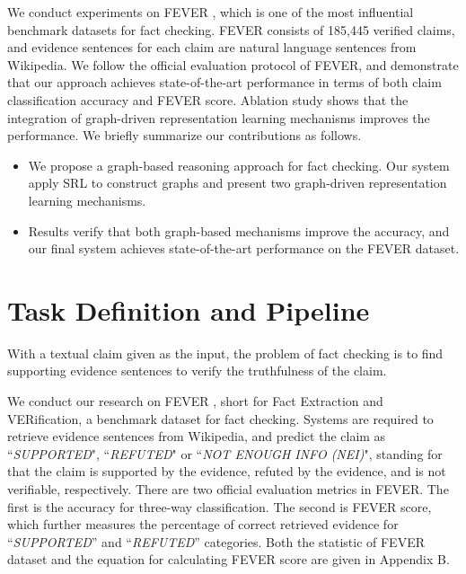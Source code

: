 \documentclass[11pt,a4paper]{article}
\begin{document}
We conduct experiments on FEVER \cite{thorne2018fever}, 
which is one of the most influential benchmark datasets for fact checking.
FEVER consists of 185,445 verified claims, and evidence sentences for each claim are natural language sentences from Wikipedia. 
We follow the official evaluation protocol of FEVER, and demonstrate that
our approach achieves state-of-the-art performance in terms of both claim classification accuracy and FEVER score.
Ablation study shows that the integration of graph-driven representation learning mechanisms improves the performance.
We briefly summarize our contributions as follows.
\begin{itemize}
	\item We propose a graph-based reasoning approach
for fact checking. Our system apply SRL to construct graphs and present two graph-driven representation learning mechanisms.
\item Results verify that both graph-based mechanisms improve the accuracy, and our final system achieves state-of-the-art performance on the FEVER dataset.
\end{itemize}




\section{Task Definition and Pipeline}
\label{section:task-and-pipeline}
With a textual claim given as the input, the problem of fact checking is to find supporting evidence sentences to verify the truthfulness of the claim.


We conduct our research on FEVER \cite{thorne2018fever}, short for Fact Extraction and VERification, a benchmark dataset for fact checking.
Systems are required to retrieve evidence sentences from Wikipedia, and predict the  
claim as ``\textsl{SUPPORTED}", ``\textsl{REFUTED}" or ``\textsl{NOT ENOUGH INFO (NEI)}", standing for that the claim is supported by the evidence, refuted by the evidence, and is not verifiable, respectively.
There are two official evaluation metrics in FEVER.
The first is the accuracy for three-way classification.
The second is FEVER score, which further measures the percentage of correct retrieved evidence for ``\textsl{SUPPORTED}'' and ``\textsl{REFUTED}'' categories.
Both the statistic of FEVER dataset and the equation for calculating FEVER score are given in Appendix B.  
\end{document}
